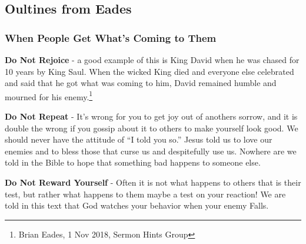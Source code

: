\subsection{Oultines from Eades}

\subsubsection{When People Get What's Coming to Them}
\begin{compactenum}[I.][5]
    \item \textbf{Do Not Rejoice} - a good example of this is King David when he was chased for 10 years by King Saul. When the wicked King died and everyone else celebrated and said that he got what was coming to him, David remained humble and mourned for his enemy.\footnote{Brian Eades, 1 Nov 2018, Sermon Hints Group}
    \item \textbf{Do Not Repeat} - It's wrong for you to get joy out of anothers sorrow, and it is double the wrong if you gossip about it to others to make yourself look good. We should never have the attitude of ``I told you so.'' Jesus told us to love our enemies and to bless those that curse us and despitefully use us. Nowhere are we told in the Bible to hope that something bad happens to someone else.
    \item \textbf{Do Not Reward Yourself} - Often it is not what happens to others that is their test, but rather what happens to them maybe a test on your reaction! We are told in this text that God watches your behavior when your enemy Falls.
\end{compactenum}



